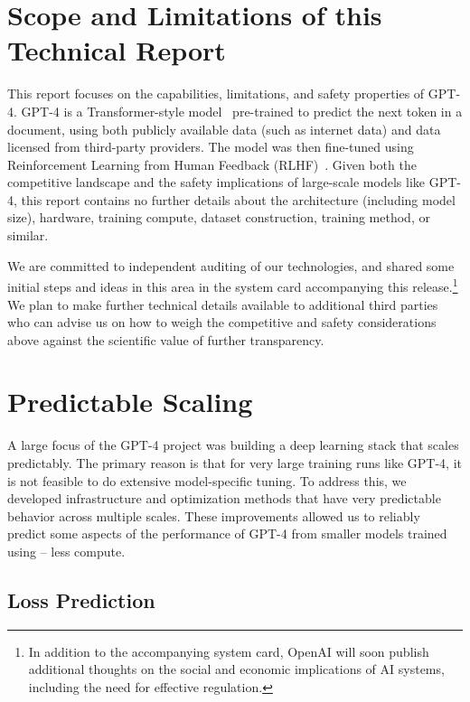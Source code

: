 \documentclass{article}
\begin{document}
\section{Scope and Limitations of this Technical Report}

This report focuses on the capabilities, limitations, and safety properties of GPT-4. GPT-4 is a Transformer-style model~\cite{vaswani2017attention} pre-trained to predict the next token in a document, using both publicly available data (such as internet data) and data licensed from third-party providers. The model was then fine-tuned using Reinforcement Learning from Human Feedback (RLHF)~\citep{christiano2017deep}. Given both the competitive landscape and the safety implications of large-scale models like GPT-4, this report contains no further details about the architecture (including model size), hardware, training compute, dataset construction, training method, or similar.


We are committed to independent auditing of our technologies, and shared some initial steps and ideas in this area in the system card accompanying this release.\footnote{In addition to the accompanying system card, OpenAI will soon publish additional thoughts on the social and economic implications of AI systems, including the need for effective regulation.} We plan to make further technical details available to additional third parties who can advise us on how to weigh the competitive and safety considerations above against the scientific value of further transparency.








\section{Predictable Scaling}

A large focus of the GPT-4 project was building a deep learning stack that scales predictably. The primary reason is that for very large training runs like GPT-4, it is not feasible to do extensive model-specific tuning. To address this, we developed infrastructure and optimization methods that have very predictable behavior across multiple scales. These improvements allowed us to reliably predict some aspects of the performance of GPT-4 from smaller models trained using  --  less compute.

\subsection{Loss Prediction}
\end{document}
